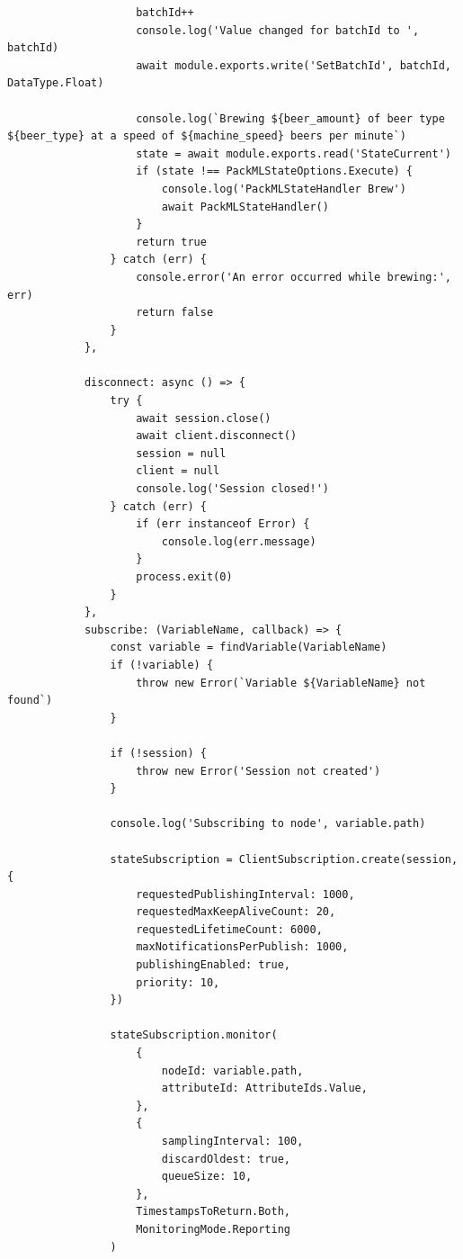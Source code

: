 \begin{center}
\begin{verbatim}
                    batchId++
                    console.log('Value changed for batchId to ', batchId)
                    await module.exports.write('SetBatchId', batchId, DataType.Float)

                    console.log(`Brewing ${beer_amount} of beer type ${beer_type} at a speed of ${machine_speed} beers per minute`)
                    state = await module.exports.read('StateCurrent')
                    if (state !== PackMLStateOptions.Execute) {
                        console.log('PackMLStateHandler Brew')
                        await PackMLStateHandler()
                    }
                    return true
                } catch (err) {
                    console.error('An error occurred while brewing:', err)
                    return false
                }
            },

            disconnect: async () => {
                try {
                    await session.close()
                    await client.disconnect()
                    session = null
                    client = null
                    console.log('Session closed!')
                } catch (err) {
                    if (err instanceof Error) {
                        console.log(err.message)
                    }
                    process.exit(0)
                }
            },
            subscribe: (VariableName, callback) => {
                const variable = findVariable(VariableName)
                if (!variable) {
                    throw new Error(`Variable ${VariableName} not found`)
                }

                if (!session) {
                    throw new Error('Session not created')
                }

                console.log('Subscribing to node', variable.path)

                stateSubscription = ClientSubscription.create(session, {
                    requestedPublishingInterval: 1000,
                    requestedMaxKeepAliveCount: 20,
                    requestedLifetimeCount: 6000,
                    maxNotificationsPerPublish: 1000,
                    publishingEnabled: true,
                    priority: 10,
                })

                stateSubscription.monitor(
                    {
                        nodeId: variable.path,
                        attributeId: AttributeIds.Value,
                    },
                    {
                        samplingInterval: 100,
                        discardOldest: true,
                        queueSize: 10,
                    },
                    TimestampsToReturn.Both,
                    MonitoringMode.Reporting
                )


\end{verbatim}
\end{center}
